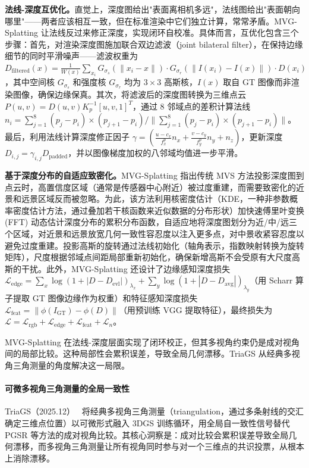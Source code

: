 \textbf{法线-深度互优化。}直觉上，深度图给出"表面离相机多远"，法线图给出"表面朝向哪里"——两者应该相互一致，但在标准渲染中它们独立计算，常常矛盾。MVG-Splatting 让法线反过来修正深度，实现闭环自校准。具体而言，互优化包含三个步骤：首先，对渲染深度图施加联合双边滤波（joint bilateral filter），在保持边缘细节的同时平滑噪声——滤波权重为 $D_{\text{filtered}}(x) = \frac{1}{W(x)}\sum_{x_i} G_{\sigma_s}(\|x_i - x\|) \cdot G_{\sigma_r}(\|I(x_i) - I(x)\|) \cdot D(x_i)$，其中空间核 $G_{\sigma_s}$ 和强度核 $G_{\sigma_r}$ 均为 $3\times 3$ 高斯核，$I(x)$ 取自 GT 图像而非渲染图像，确保边缘保真。其次，将滤波后的深度图转换为三维点云 $P(u,v) = D(u,v) K_p^{-1}[u,v,1]^T$，通过 8 邻域点的差积计算法线 $n_i = \sum_{j=1}^{8}(p_j - p_i) \times (p_{j+1} - p_i) / \|\sum_{j=1}^{8}(p_j - p_i) \times (p_{j+1} - p_i)\|$。最后，利用法线计算深度修正因子 $\gamma = (\frac{u-c_x}{f_x^p} n_x + \frac{v-c_y}{f_y^p} n_y + n_z)$，更新深度 $D_{i,j} = \gamma_{i,j} D_{\text{padded}}$，并以图像梯度加权的八邻域均值进一步平滑。

\textbf{基于深度分布的自适应致密化。}MVG-Splatting 指出传统 MVS 方法投影深度图到点云时，高置信度区域（通常是传感器中心附近）被过度重建，而需要致密化的近景和远景区域反而被忽略。为此，该方法利用核密度估计（KDE，一种非参数概率密度估计方法，通过叠加若干核函数来近似数据的分布形状）加快速傅里叶变换 (FFT) 动态估计深度分布的累积分布函数，自适应地将深度图划分为近/中/远三个区域，对近景和远景放宽几何一致性容忍度以注入更多点，对中景收紧容忍度以避免过度重建。投影高斯的旋转通过法线初始化（轴角表示，指数映射转换为旋转矩阵），尺度根据邻域点间距局部重新初始化，确保新增高斯不会受原有大尺度高斯的干扰。此外，MVG-Splatting 还设计了边缘感知深度损失 $\mathcal{L}_{\text{edge}} = \sum_x \log(1+|D - D_{\text{evl}}|)_{\lambda_x} + \sum_y \log(1+|D - D_{\text{avg}}|)_{\lambda_y}$（用 Scharr 算子提取 GT 图像边缘作为权重）和特征感知深度损失 $\mathcal{L}_{\text{feat}} = \|\phi(I_{\text{GT}}) - \phi(D)\|$（用预训练 VGG 提取特征），最终损失为 $\mathcal{L} = \mathcal{L}_{\text{rgb}} + \mathcal{L}_{\text{edge}} + \mathcal{L}_{\text{feat}} + \mathcal{L}_n$。

MVG-Splatting 在法线-深度层面实现了闭环校正，但其多视角约束仍是成对视角间的局部比较。这种局部性会累积误差，导致全局几何漂移。TriaGS 从经典多视角三角测量的角度解决这一局限。

\paragraph{可微多视角三角测量的全局一致性}

TriaGS（2025.12）~\cite{2512_06269} 将经典多视角三角测量（triangulation，通过多条射线的交汇确定三维点位置）以可微形式融入 3DGS 训练循环，用全局自一致性信号替代 PGSR 等方法的成对视角比较。其核心洞察是：成对比较会累积误差导致全局几何漂移，而多视角三角测量让所有视角同时参与对一个三维点的共识投票，从根本上消除漂移。

